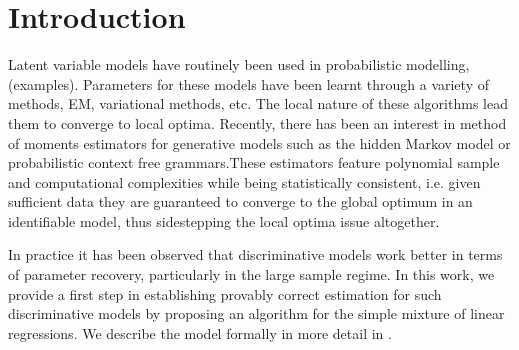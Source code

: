 \section{Introduction}
\label{sec:intro}


Latent variable models have routinely been used in probabilistic
modelling, (examples). Parameters for these models have been learnt
through a variety of methods, EM, variational methods, etc. The local
nature of these algorithms lead them to converge to local optima.
Recently, there has been an interest in method of moments estimators for
generative models such as the hidden Markov
model\cite{AnandkumarHsuKakade2012} or probabilistic context free
grammars\cite{HsuKakadeLiang2012}.These estimators feature polynomial
sample and computational complexities while being statistically
consistent, i.e. given sufficient data they are guaranteed to converge
to the global optimum in an identifiable model, thus sidestepping the
local optima issue altogether.

In practice it has been observed that discriminative models work better
in terms of parameter recovery\citationneeded, particularly in the large
sample regime. 
In this work, we provide a first step in establishing provably correct
estimation for such discriminative models by proposing an algorithm for
the simple mixture of linear regressions. We describe the model formally
in more detail in .



